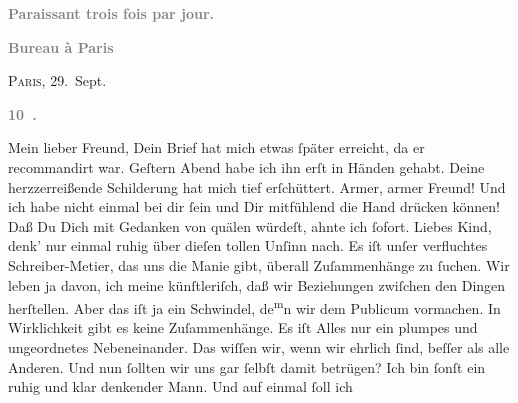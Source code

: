 \begin{ledgroupsized}[t]{13cm}
           \pstart
           \begin{otherlanguage}{french}\textcolor{gray}{\textbf{\textbf{Paraissant trois fois par jour.}}}\end{otherlanguage}\pend
           \pstart
           \begin{otherlanguage}{french}\textcolor{gray}{\textbf{\textbf{Bureau à Paris}}}\end{otherlanguage}\hfill \textsc{Paris}, 29. Sept.\pend
           \pstart
           \begin{otherlanguage}{french}\textcolor{gray}{\textbf{\textbf{10 .}}}\end{otherlanguage}\pend
           \pstart\center{}Mein lieber Freund,\pend\pstart
           Dein Brief hat mich etwas ſpäter erreicht, da er recommandirt war. Geſtern{ }Abend habe ich ihn erſt in Händen gehabt. Deine herzzerreißende
               Schilderung hat mich tief erſchüttert. Armer, armer Freund! Und ich habe nicht einmal
               bei dir ſein und Dir mitfühlend die Hand drücken können!\pend
           \pstart
           Daß Du Dich mit Gedanken von \label{K_L02827-1v}\label{K_L02827-1h} quälen würdeſt, ahnte ich ſofort. Liebes Kind, denk’ nur einmal ruhig über
               dieſen tollen Unſinn nach. Es iſt unſer \strikeout{\textcolor{gray}{×}\-\textcolor{gray}{×}\-\textcolor{gray}{×}\-\textcolor{gray}{×}{ }\textcolor{gray}{×}\-\textcolor{gray}{×}\-\textcolor{gray}{×}\-\textcolor{gray}{×}\-\textcolor{gray}{×}\-\textcolor{gray}{×}{ }\textcolor{gray}{×}\-\textcolor{gray}{×}\-\textcolor{gray}{×}\-\textcolor{gray}{×}} verfluchtes Schreiber-{\pb}Metier, das uns die
               Manie gibt, überall Zuſammenhänge zu ſuchen. Wir leben ja davon, ich meine
               künſtleriſch, daß wir Beziehungen zwiſchen den Dingen herſtellen. Aber das iſt ja ein
               Schwindel, de\substVorne{}\textsuperscript{m}\substDazwischen{}n\substHinten{} wir dem Publicum vormachen. In Wirklichkeit gibt es keine Zuſammenhänge. Es
               iſt Alles nur ein plumpes und ungeordnetes Nebeneinander. Das wiſſen wir, wenn wir
               ehrlich ſind, beſſer als alle Anderen. Und nun ſollten wir uns gar ſelbſt damit
               betrügen? Ich bin ſonſt ein ruhig und klar denkender Mann. Und auf einmal ſoll ich

\end{ledgroupsized}
